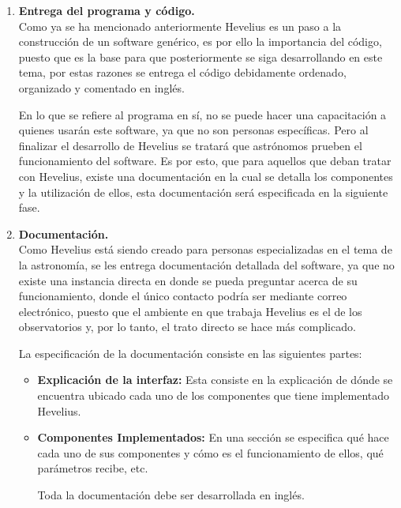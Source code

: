 \documentclass[letterpaper,titlepage,spanish,10pt]{article}
\begin{document}
\begin{enumerate}
	\item {\bf{Entrega del programa y c\'odigo.}}\\
Como ya se ha mencionado anteriormente Hevelius es un paso a la construcci\'on 
de un software gen\'erico, es por ello la importancia del c\'odigo, puesto que 
es la base para que posteriormente se siga desarrollando en este tema, por 
estas razones se entrega el c\'odigo debidamente ordenado, organizado y 
comentado en ingl\'es.

En lo que se refiere al programa en s\'i, no se puede hacer una capacitaci\'on 
a quienes usar\'an este software, ya que no son personas espec\'ificas. Pero al 
finalizar el desarrollo de Hevelius se tratar\'a que astr\'onomos prueben el 
funcionamiento del software. Es por esto, que para aquellos que deban tratar 
con Hevelius, existe una documentaci\'on en la cual se detalla los componentes 
y la utilizaci\'on de ellos, esta documentaci\'on ser\'a especificada en la 
siguiente fase.\\

	\item{\bf{Documentaci\'on.}}\\
Como Hevelius est\'a siendo creado para personas especializadas en el tema de 
la astronom\'ia, se les entrega documentaci\'on detallada del software, ya que 
no existe una instancia directa en donde se pueda preguntar acerca de su 
funcionamiento, donde el \'unico contacto podr\'ia ser mediante correo 
electr\'onico, puesto que el ambiente en que trabaja Hevelius es el de los 
observatorios y, por lo tanto, el trato directo se hace m\'as complicado.

La especificaci\'on de la documentaci\'on consiste en las siguientes partes:

\begin{itemize}
	\item {\bf{Explicaci\'on de la interfaz:}} Esta consiste en la 
explicaci\'on de d\'onde se encuentra ubicado cada uno de los componentes que 
tiene implementado Hevelius.
	\item{ \bf{Componentes Implementados:}} En una secci\'on se especifica 
qu\'e hace cada uno de sus componentes y c\'omo es el funcionamiento de ellos, 
qu\'e par\'ametros recibe, etc.

Toda la documentaci\'on debe ser desarrollada en ingl\'es.
\end{itemize}
\end{enumerate}
\end{document}
